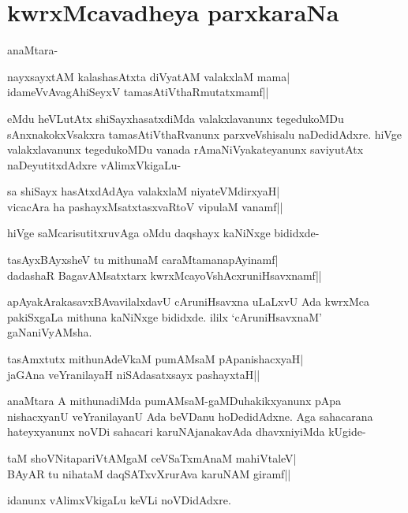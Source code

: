 \section*{kwrxMcavadheya parxkaraNa} 

anaMtara- 

\begin{shloka} 
nayxsayxtAM kalashasAtxta diVyatAM valakxlaM mama|\label{198}\\ 
idameVvAvagAhiSeyxV tamasAtiVthaRmutatxmamf||
\end{shloka}
eMdu heVLutAtx shiSayxhasatxdiMda valakxlavanunx tegedukoMDu sAnxnakokxVsakxra tamasAtiVthaRvanunx parxveVshisalu naDedidAdxre. hiVge valakxlavanunx tegedukoMDu vanada rAmaNiVyakateyanunx saviyutAtx naDeyutitxdAdxre vAlimxVkigaLu- 

\begin{shloka} 
sa shiSayx hasAtxdAdAya valakxlaM niyateVMdirxyaH|\label{198b}\\ 
vicacAra ha pashayxMsatxtasxvaRtoV vipulaM vanamf||
\end{shloka}

hiVge saMcarisutitxruvAga oMdu daqshayx kaNiNxge bididxde- 

\begin{shloka} 
tasAyxBAyxsheV tu mithunaM caraMtamanapAyinamf|\label{198a}\\ 
dadashaR BagavAMsatxtarx kwrxMcayoVshAcxruniHsavxnamf||
\end{shloka}

apAyakArakasavxBAvavilalxdavU cAruniHsavxna uLaLxvU Ada kwrxMca pakiSxgaLa mithuna kaNiNxge bididxde. ililx `cAruniHsavxnaM' gaNaniVyAMsha. 

\begin{shloka}
tasAmxtutx mithunAdeVkaM pumAMsaM pApanishacxyaH|\label{198d}\\ 
jaGAna veYranilayaH niSAdasatxsayx pashayxtaH||
\end{shloka}

anaMtara A mithunadiMda pumAMsaM-gaMDuhakikxyanunx pApa nishacxyanU veYranilayanU Ada beVDanu hoDedidAdxne. Aga sahacarana hateyxyanunx noVDi sahacari karuNAjanakavAda dhavxniyiMda kUgide- 

\begin{shloka}
taM shoVNitapariVtAMgaM ceVSaTxmAnaM mahiVtaleV|\label{198c}\\ 
BAyAR tu nihataM daqSATxvXrurAva karuNAM giramf||
\end{shloka}

idanunx vAlimxVkigaLu keVLi noVDidAdxre. 

